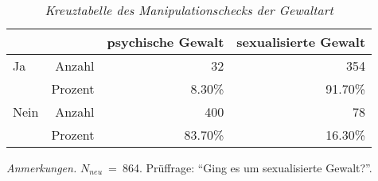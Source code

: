 \begin{table}[htb]
    \caption[Kreuztabelle Manipulationscheck Gewaltart]{\textit {Kreuztabelle des Manipulationschecks der Gewaltart}} 
    \label{KT_G}
    \centering
    \begin{adjustbox}{width=10cm} %
    \small
    \begin{tabular}{lrrr}
      \hline
        &   & psychische Gewalt & sexualisierte Gewalt \\
      \hline
    Ja   & Anzahl  & 32      & 354     \\
         & Prozent & 8.30\%  & 91.70\% \\
    Nein & Anzahl  & 400     & 78      \\
         & Prozent & 83.70\% & 16.30\% \\
       \hline
    \end{tabular}
    \end{adjustbox}
    
    \begin{tablenotes}
        \item \textit{Anmerkungen.} \( N_{neu} \)~=~864. Prüffrage: \enquote{Ging es um sexualisierte Gewalt?}.
      \end{tablenotes}
    \end{table}